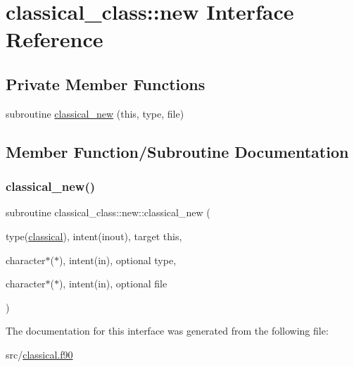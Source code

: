 \hypertarget{interfaceclassical__class_1_1new}{}\section{classical\+\_\+class\+:\+:new Interface Reference}
\label{interfaceclassical__class_1_1new}
\subsection*{Private Member Functions}
\begin{DoxyCompactItemize}
\item 
subroutine \hyperlink{interfaceclassical__class_1_1new_a3c7ec6dd3f8608dc641d7ba3d3f1db2d}{classical\+\_\+new} (this, type, file)
\end{DoxyCompactItemize}


\subsection{Member Function/\+Subroutine Documentation}
\mbox{\label{interfaceclassical__class_1_1new_a3c7ec6dd3f8608dc641d7ba3d3f1db2d}} 
\subsubsection{\texorpdfstring{classical\+\_\+new()}{classical\_new()}}
{\footnotesize\ttfamily subroutine classical\+\_\+class\+::new\+::classical\+\_\+new (\begin{DoxyParamCaption}\item[{type(\hyperlink{structclassical__class_1_1classical}{classical}), intent(inout), target}]{this,  }\item[{character$\ast$($\ast$), intent(in), optional}]{type,  }\item[{character$\ast$($\ast$), intent(in), optional}]{file }\end{DoxyParamCaption})\hspace{0.3cm}{\ttfamily [private]}}



The documentation for this interface was generated from the following file\+:\begin{DoxyCompactItemize}
\item 
src/\hyperlink{classical_8f90}{classical.\+f90}\end{DoxyCompactItemize}
